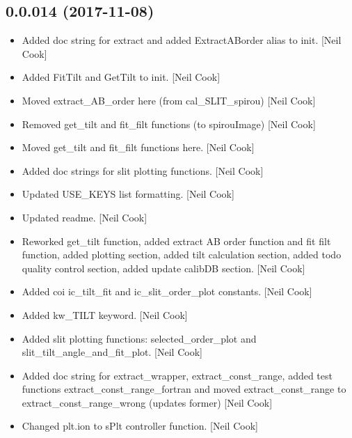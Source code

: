 \documentclass[a4paper,10pt,english]{report}
\begin{document}
\subsection{0.0.014 (2017-11-08)}
\label{\detokenize{misc/changelog:id535}}\begin{itemize}
\item {} 
Added doc string for extract and added ExtractABorder alias to init.
{[}Neil Cook{]}

\item {} 
Added FitTilt and GetTilt to init. {[}Neil Cook{]}

\item {} 
Moved extract\_AB\_order here (from cal\_SLIT\_spirou) {[}Neil Cook{]}

\item {} 
Removed get\_tilt and fit\_filt functions (to spirouImage) {[}Neil Cook{]}

\item {} 
Moved get\_tilt and fit\_filt functions here. {[}Neil Cook{]}

\item {} 
Added doc strings for slit plotting functions. {[}Neil Cook{]}

\item {} 
Updated USE\_KEYS list formatting. {[}Neil Cook{]}

\item {} 
Updated readme. {[}Neil Cook{]}

\item {} 
Reworked get\_tilt function, added extract AB order function and fit
filt function, added plotting section, added tilt calculation section,
added todo quality control section, added update calibDB section.
{[}Neil Cook{]}

\item {} 
Added coi ic\_tilt\_fit and ic\_slit\_order\_plot constants. {[}Neil Cook{]}

\item {} 
Added kw\_TILT keyword. {[}Neil Cook{]}

\item {} 
Added slit plotting functions: selected\_order\_plot and
slit\_tilt\_angle\_and\_fit\_plot. {[}Neil Cook{]}

\item {} 
Added doc string for extract\_wrapper, extract\_const\_range, added test
functions extract\_const\_range\_fortran and moved extract\_const\_range to
extract\_const\_range\_wrong (updates former) {[}Neil Cook{]}

\item {} 
Changed plt.ion to sPlt controller function. {[}Neil Cook{]}

\end{itemize}
\end{document}
